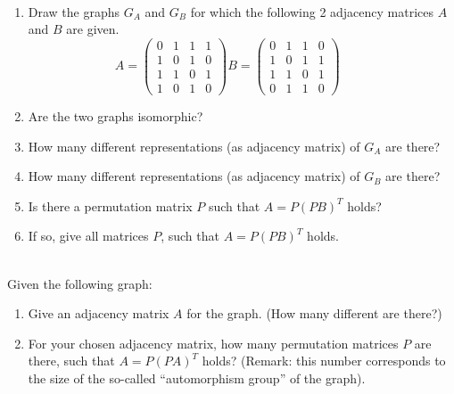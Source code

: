 \documentclass[10pt]{article}
\begin{document}
\\
\begin{enumerate}
\item Draw the graphs $G_A$ and $G_B$ for which the following 2 adjacency matrices $A$ and $B$ are given.
\begin{equation*}
A= \left(\begin{array}{ccccc}
           0 & 1 & 1 & 1  \\
           1 & 0 & 1 & 0  \\
           1 & 1 & 0 & 1  \\
           1 & 0 & 1 & 0  
\end{array}\right)
B= \left(\begin{array}{ccccc}
           0 & 1 & 1 & 0  \\
           1 & 0 & 1 & 1  \\
           1 & 1 & 0 & 1  \\
           0 & 1 & 1 & 0  
\end{array}\right)\hspace{1cm}
\end{equation*}
\item Are the two graphs isomorphic?
\item How many different representations (as adjacency matrix) of $G_A$ are there?
\item How many different representations (as adjacency matrix) of $G_B$ are there?
\item Is there a permutation matrix $P$ such that $A=P\left(PB\right)^T$ holds? 
\item If so, give all matrices $P$, such that  $A=P\left(PB\right)^T$ holds.
\end{enumerate}

\\[1cm]
Given the following graph:\\

\begin{enumerate}
\item Give an adjacency matrix $A$ for the graph. (How many different are there?)
\item For your chosen adjacency matrix, how many permutation matrices $P$ are there, such that
  $A=P\left(PA\right)^T$ holds? (Remark: this number corresponds to the size of the so-called ``automorphism group'' of the graph). 
\end{enumerate}
\newpage
\end{document}
